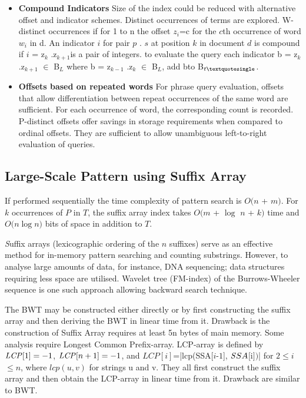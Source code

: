 \begin{itemize}

 \item \textbf {Compound Indicators}
Size of the index could be reduced with alternative offset and indicator schemes. Distinct occurrences of terms are explored. W-distinct occurrences if for 1 to n the offset $z$$_{i}$=c for the $c$th occurrence 
of word $w$$_{i}$ in d.  An indicator $i$ for pair $p$ . $s$ at position $k$ in document $d$ is compound if $i$ = z$_{k}$ .z$_{k+1}$is a pair of integers. to evaluate the query each indicator b\textquotesingle
= z$_{k}$ .z$_{k+1}$ $\in$ B$_{L}$ where b = z$_{k-1}$ .z$_{k}$
$\in$ B$_{L}$, add b\textquotesingle to B$_{t\textquotesingle}$. 

 \item \textbf {Offsets based on repeated words}
For phrase query evaluation, offsets that allow differentiation between repeat occurrences of the same word are sufficient. For each occurrence of word, the corresponding count is recorded. 
P-distinct offsets offer savings in storage requirements when compared to ordinal offsets. They are sufficient to allow unambiguous left-to-right evaluation of queries. 

\end{itemize}

\subsection{Large-Scale Pattern using Suffix Array}
If performed sequentially the time complexity of pattern search is $O$$($$n$ + $m$$)$. For $k$ occurrences of $P$ in $T$, the suffix array index takes $O$$($$m$ + $\log$ $n$ + $k$$)$ time and $O$$($$n\log n$$)$ bits of space in addition to $T$. 

{\emph Suffix arrays} (lexicographic ordering of the $n$ suffixes) serve as an effective method for in-memory pattern searching and counting substrings. However, to analyse large amounts of data, for instance, DNA sequencing; data structures requiring 
less space are utilised. Wavelet tree (FM-index) of the Burrows{-}Wheeler sequence is one such approach allowing backward search technique. 

The BWT may be constructed either directly or by first constructing the suffix array and then deriving the BWT in linear time from it. Drawback is the construction of Suffix Array requires at least 5n bytes of main memory. 
Some analysis require Longest Common Prefix-array. LCP-array is defined by $\mbox{\emph{LCP}}[1]=-1$, $\mbox{\emph{LCP}}[n + 1]=-1$, and $LCP[i]$=|lcp(SSA[$i${-}$1$], $\mbox{\emph{S}}SA$$[$i$]$$)$| for $2$$\leq$$i$$\leq$$n$, where $lcp(u, v)$ for strings u and v. They all first construct the suffix array and then obtain the LCP-array in linear time from it. Drawback are similar to BWT.

